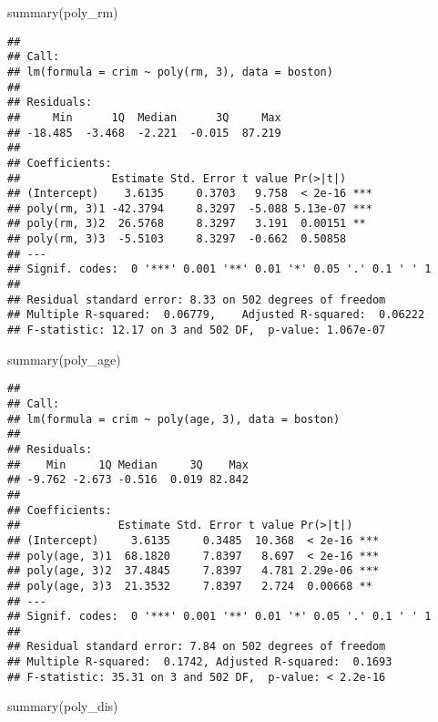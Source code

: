 \documentclass[
]{article}
\newenvironment{Shaded}{\begin{snugshade}}{\end{snugshade}}
\newcommand{\FunctionTok}[1]{\textcolor[rgb]{0.00,0.00,0.00}{#1}}
\newcommand{\NormalTok}[1]{#1}
\begin{document}
\begin{Shaded}
\begin{Highlighting}[]
\FunctionTok{summary}\NormalTok{(poly\_rm)}
\end{Highlighting}
\end{Shaded}

\begin{verbatim}
## 
## Call:
## lm(formula = crim ~ poly(rm, 3), data = boston)
## 
## Residuals:
##     Min      1Q  Median      3Q     Max 
## -18.485  -3.468  -2.221  -0.015  87.219 
## 
## Coefficients:
##              Estimate Std. Error t value Pr(>|t|)    
## (Intercept)    3.6135     0.3703   9.758  < 2e-16 ***
## poly(rm, 3)1 -42.3794     8.3297  -5.088 5.13e-07 ***
## poly(rm, 3)2  26.5768     8.3297   3.191  0.00151 ** 
## poly(rm, 3)3  -5.5103     8.3297  -0.662  0.50858    
## ---
## Signif. codes:  0 '***' 0.001 '**' 0.01 '*' 0.05 '.' 0.1 ' ' 1
## 
## Residual standard error: 8.33 on 502 degrees of freedom
## Multiple R-squared:  0.06779,    Adjusted R-squared:  0.06222 
## F-statistic: 12.17 on 3 and 502 DF,  p-value: 1.067e-07
\end{verbatim}

\begin{Shaded}
\begin{Highlighting}[]
\FunctionTok{summary}\NormalTok{(poly\_age)}
\end{Highlighting}
\end{Shaded}

\begin{verbatim}
## 
## Call:
## lm(formula = crim ~ poly(age, 3), data = boston)
## 
## Residuals:
##    Min     1Q Median     3Q    Max 
## -9.762 -2.673 -0.516  0.019 82.842 
## 
## Coefficients:
##               Estimate Std. Error t value Pr(>|t|)    
## (Intercept)     3.6135     0.3485  10.368  < 2e-16 ***
## poly(age, 3)1  68.1820     7.8397   8.697  < 2e-16 ***
## poly(age, 3)2  37.4845     7.8397   4.781 2.29e-06 ***
## poly(age, 3)3  21.3532     7.8397   2.724  0.00668 ** 
## ---
## Signif. codes:  0 '***' 0.001 '**' 0.01 '*' 0.05 '.' 0.1 ' ' 1
## 
## Residual standard error: 7.84 on 502 degrees of freedom
## Multiple R-squared:  0.1742, Adjusted R-squared:  0.1693 
## F-statistic: 35.31 on 3 and 502 DF,  p-value: < 2.2e-16
\end{verbatim}

\begin{Shaded}
\begin{Highlighting}[]
\FunctionTok{summary}\NormalTok{(poly\_dis)}
\end{Highlighting}
\end{Shaded}
\end{document}
